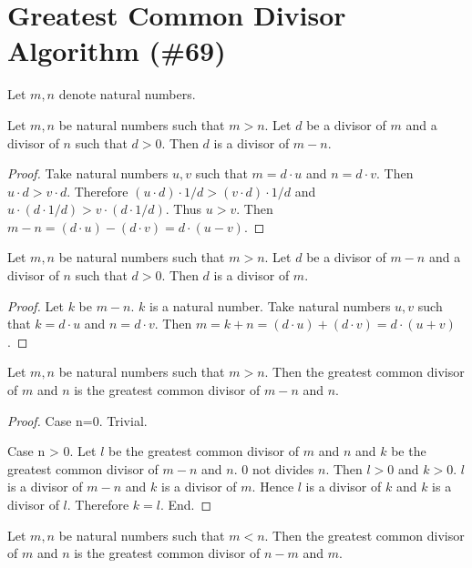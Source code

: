 \documentclass{article}
\begin{document}
\section{Greatest Common Divisor Algorithm (\#69)}

\begin{forthel}
Let $m,n$ denote natural numbers.

\begin{proposition}
Let $m,n$ be natural numbers such that $m > n$.
Let $d$ be a divisor of $m$ and a divisor of $n$ such that $d > 0$.
Then $d$ is a divisor of $m-n$.
\end{proposition}
\begin{proof}
Take natural numbers $u,v$ such that $m = d \cdot u$ and $n = d \cdot v$.
Then $u \cdot d > v \cdot d$. Therefore $(u \cdot d) \cdot 1/d > (v \cdot d) \cdot 1/d$
and $u \cdot (d \cdot 1/d) > v \cdot (d \cdot 1/d)$.
Thus $u > v$.
Then $m - n =
(d \cdot u) - (d \cdot v) =
d \cdot (u - v)$.
\end{proof}

\begin{proposition}
Let $m,n$ be natural numbers such that $m > n$.
Let $d$ be a divisor of $m-n$ and a divisor of $n$ such that $d > 0$.
Then $d$ is a divisor of $m$.
\end{proposition}
\begin{proof}
Let $k$ be $m-n$. $k$ is a natural number.
Take natural numbers $u,v$ such that $k = d \cdot u$ and $n = d \cdot v$.
Then $m = k + n =
(d \cdot u) + (d \cdot v) =
d \cdot (u + v)$.
\end{proof}

\begin{lemma}
Let $m,n$ be natural numbers such that $m > n$. Then
the greatest common divisor of $m$ and $n$
is the greatest common divisor of $m-n$ and $n$.
\end{lemma}
\begin{proof}
Case n=0. Trivial.

Case n > 0.
Let $l$ be the greatest common divisor of $m$ and $n$
and $k$ be the greatest common divisor of $m-n$ and $n$.
$0$ not divides $n$. Then $l > 0$ and $k > 0$.
$l$ is a divisor of $m-n$ and $k$ is a divisor of $m$.
Hence $l$ is a divisor of $k$ and $k$ is a divisor of $l$. Therefore $k=l$. End.
\end{proof}


\begin{proposition}
Let $m,n$ be natural numbers such that $m < n$. Then
the greatest common divisor of $m$ and $n$
is the greatest common divisor of $n-m$ and $m$.
\end{proposition}




\end{forthel}
\end{document}
